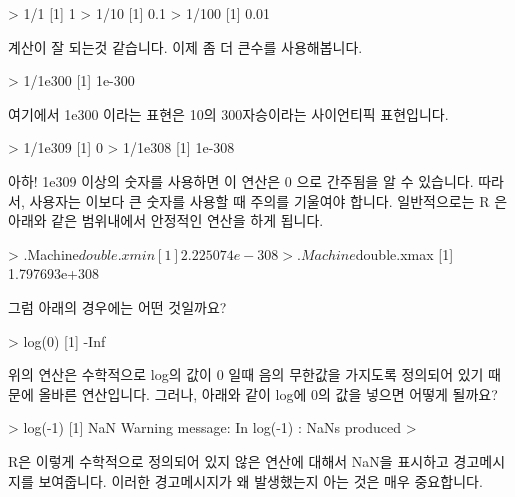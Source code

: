 \documentclass{book}
\begin{document}
\begin{Schunk}
\begin{Soutput}
> 1/1
[1] 1
> 1/10
[1] 0.1
> 1/100
[1] 0.01
\end{Soutput}
\end{Schunk}

계산이 잘 되는것 같습니다. 
이제 좀 더 큰수를 사용해봅니다. 

\begin{Schunk}
\begin{Soutput}
> 1/1e300
[1] 1e-300
\end{Soutput}
\end{Schunk}

여기에서 1e300 이라는 표현은 10의 300자승이라는 사이언티픽 표현입니다. 

\begin{Schunk}
\begin{Soutput}
> 1/1e309
[1] 0
> 1/1e308
[1] 1e-308
\end{Soutput}
\end{Schunk}

아하! 1e309 이상의 숫자를 사용하면 이 연산은 0 으로 간주됨을 알 수 있습니다. 
따라서, 사용자는 이보다 큰 숫자를 사용할 때 주의를 기울여야 합니다. 
일반적으로는 R 은 아래와 같은 범위내에서 안정적인 연산을 하게 됩니다. 

\begin{Schunk}
\begin{Soutput}
> .Machine$double.xmin
[1] 2.225074e-308
> .Machine$double.xmax
[1] 1.797693e+308
\end{Soutput}
\end{Schunk}

그럼 아래의 경우에는 어떤 것일까요?

\begin{Schunk}
\begin{Soutput}
> log(0)
[1] -Inf
\end{Soutput}
\end{Schunk}

위의 연산은 수학적으로 log의 값이 0 일때 음의 무한값을 가지도록 정의되어 있기 때문에 올바른 연산입니다. 
그러나, 아래와 같이 log에 0의 값을 넣으면 어떻게 될까요?

\begin{Schunk}
\begin{Soutput}
> log(-1)
[1] NaN
Warning message:
In log(-1) : NaNs produced
> 
\end{Soutput}
\end{Schunk}

R은 이렇게 수학적으로 정의되어 있지 않은 연산에 대해서 NaN을 표시하고 경고메시지를 보여줍니다. 
이러한 경고메시지가 왜 발생했는지 아는 것은 매우 중요합니다. 
\end{document}
